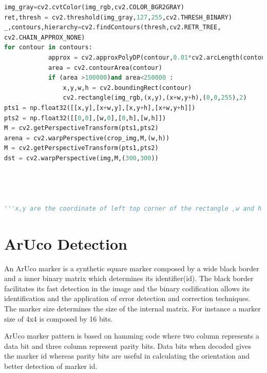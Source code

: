 \documentclass[main.tex]{subfiles}
\begin{document}
\pagebreak
\begin{lstlisting}[language=Python, caption = Black Box area crop and perspective trasform]
img_gray=cv2.cvtColor(img_rgb,cv2.COLOR_BGR2GRAY)
ret,thresh = cv2.threshold(img_gray,127,255,cv2.THRESH_BINARY)
_,contours,hierarchy=cv2.findContours(thresh,cv2.RETR_TREE,
cv2.CHAIN_APPROX_NONE)
for contour in contours:            
            approx = cv2.approxPolyDP(contour,0.01*cv2.arcLength(contour,True),True)
            area = cv2.contourArea(contour)        
            if (area >100000)and area<250000 :                
                x,y,w,h = cv2.boundingRect(contour)
                cv2.rectangle(img_rgb,(x,y),(x+w,y+h),(0,0,255),2)
pts1 = np.float32([[x,y],[x+w,y],[x,y+h],[x+w,y+h]])
pts2 = np.float32([[0,0],[w,0],[0,h],[w,h]])
M = cv2.getPerspectiveTransform(pts1,pts2)
arena = cv2.warpPerspective(crop_img,M,(w,h))
M = cv2.getPerspectiveTransform(pts1,pts2) 
dst = cv2.warpPerspective(img,M,(300,300))                
                
                
                
                
'''x,y are the coordinate of left top corner of the rectangle ,w and h are width and height of rectangle respectively,dst is the transformed image'''

\end{lstlisting}
\pagebreak	


\section{ArUco Detection} 
An ArUco marker is a synthetic square marker composed by a wide black border and a inner binary matrix which determines its identifier(id). The black border facilitates its fast detection in the image and the binary codification allows its identification and the application of error detection and correction techniques. The marker size determines the size of the internal matrix. For instance a marker size of 4x4 is composed by 16 bits.

ArUco marker pattern is based on hamming code where two column represents a data bit and three column represent parity bits.
Data bits when decoded gives the marker id whereas parity bits are useful in calculating the orientation and better detection of marker id.\\
\end{document}
